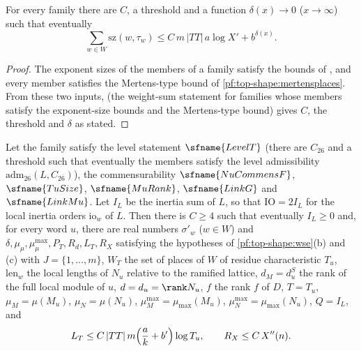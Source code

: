 \begin{lemma}\label{pf:top-shape:tausum}
For every family there are $C$, a threshold and a function $\delta(x)\to0$ ($x\to\infty$) such that eventually
\[
\sum_{w\in W}\mathrm{sz}(w,\tau_w)\le C\,m\,|TT|\,a\log X'+b^{\delta(x)} .
\]
\end{lemma}

\begin{proof}
The exponent sizes of the members of a family satisfy the bounds of
, and every member satisfies the
Mertens-type bound of \cref{pf:top-shape:mertensplaces}. From these two inputs,
 (the weight-sum statement for families whose
members satisfy the exponent-size bounds and the Mertens-type bound) gives $C$, the threshold and $\delta$ as
stated.
\end{proof}

\begin{proposition}\label{pf:top-shape:places}
Let the family satisfy the level statement $\sfname{LevelT}$ (there are $C_{26}$ and a threshold such that eventually
the members satisfy the level admissibility $\mathrm{adm}_{26}(L,C_{26})$), the commensurability $\sfname{NuCommensF}$,
$\sfname{TuSize}$, $\sfname{MuRank}$, $\sfname{LinkG}$ and $\sfname{LinkMu}$. Let $I_L$ be the inertia sum of $L$, so
that $\mathrm{IO}=2I_L$ for the local inertia orders $\mathrm{io}_w$ of $L$. Then there is $C\ge4$ such that eventually
$I_L\ge0$ and, for every word $u$, there are real numbers $\sigma'_w$ ($w\in W$) and
$\delta,\mu_\mu,\mu^{\max}_\mu,P_T,R_d,L_T,R_X$ satisfying the hypotheses of \cref{pf:top-shape:wse}(b) and (c) with
$J=\{1,\dots,m\}$, $W_T$ the set of places of $W$ of residue characteristic $T_u$, $\mathrm{len}_w$ the local lengths
of $N_u$ relative to the ramified lattice, $d_M=d^S_u$ the rank of the full local module of $u$, $d=d_u=\rank N_u$,
$f$ the rank $f$ of $D$, $T=T_u$, $\mu_M=\mu(M_u)$, $\mu_N=\mu(N_u)$, $\mu^{\max}_M=\mu_{\max}(M_u)$,
$\mu^{\max}_N=\mu_{\max}(N_u)$, $Q=I_L$, and
\[
L_T\le C\,|TT|\,m\Bigl(\frac ak+b'\Bigr)\log T_u,\qquad R_X\le C\,X''(n).
\]
\end{proposition}

